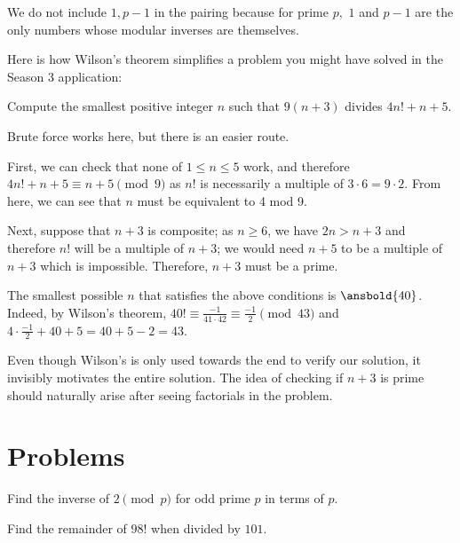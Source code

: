 \documentclass[mast]{lucky}
\begin{document}
We do not include $1,p-1$ in the pairing because for prime $p,$ $1$ and $p-1$ are the only numbers whose modular inverses are themselves.

Here is how Wilson's theorem simplifies a problem you might have solved in the Season 3 application:

\begin{exam}
Compute the smallest positive integer $n$ such that $9(n+3)$ divides $4n!+n+5$.
\end{exam}

\begin{sol}
Brute force works here, but there is an easier route.

First, we can check that none of $1\le n\le 5$ work, and therefore $4n!+n+5\equiv n+5\pmod{9}$ as $n!$ is necessarily a multiple of $3\cdot 6=9\cdot 2$. From here, we can see that $n$ must be equivalent to 4 mod 9.

Next, suppose that $n+3$ is composite; as $n\ge 6$, we have $2n>n+3$ and therefore $n!$ will be a multiple of $n+3$; we would need $n+5$ to be a multiple of $n+3$ which is impossible. Therefore, $n+3$ must be a prime.

The smallest possible $n$ that satisfies the above conditions is $\ansbold{40}$. Indeed, by Wilson's theorem, $40!\equiv \frac{-1}{41\cdot 42} \equiv \frac{-1}{2}\pmod{43}$ and $4\cdot \frac{-1}{2}+40+5=40+5-2=43$.
\end{sol}

\begin{remark}
Even though Wilson's is only used towards the end to verify our solution, it invisibly motivates the entire solution. The idea of checking if $n+3$ is prime should naturally arise after seeing factorials in the problem.
\end{remark}
\pagebreak

\section{Problems}


\begin{prob}[]{1}
Find the inverse of $2\pmod {p}$ for odd prime $p$ in terms of $p.$
\end{prob}
    
\begin{prob}[]{1}
Find the remainder of $98!$ when divided by $101.$
\end{prob}
\end{document}
